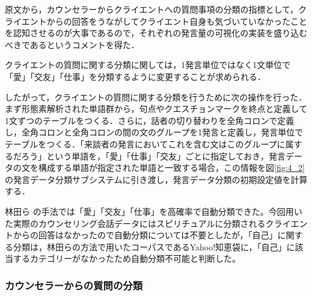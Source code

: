 \documentclass[shuuron]{kuee}
\begin{document}
原文から，カウンセラーからクライエントへの質問事項の分類の指標として，クライエントからの回答をうながしてクライエント自身も気づいていなかったことを認知させるのが大事であるので，それぞれの発言量の可視化の実装を盛り込むべきであるというコメントを得た．

クライエントの質問に関する分類に関しては，1発言単位ではなく1文単位で「愛」「交友」「仕事」を分類するように変更することが求められる．


したがって，クライエントの質問に関する分類を行うために次の操作を行った．まず形態素解析された単語群から，句点やクエスチョンマークを終点と定義して1文ずつのテーブルをつくる．さらに，話者の切り替わりを全角コロンで定義し，全角コロンと全角コロンの間の文のグループを1発言と定義し，発言単位でテーブルをつくる．「来談者の発言においてこれを含む文はこのグループに属するだろう」という単語を，「愛」「仕事」「交友」ごとに指定しておき，発言データの文を構成する単語が指定された単語と一致する場合，この情報を図\ref{fig:4_2}の発言データ分類サブシステムに引き渡し，発言データ分類の初期設定値を計算する．

林田ら\cite{hayashidaJp} \cite{hayashidaEn}の手法では「愛」「交友」「仕事」を高確率で自動分類できた。今回用いた実際のカウンセリング会話データにはスピリチュアルに分類されるクライエントからの回答はなかったので自動分類については不要としたが，「自己」に関する分類は，林田らの方法で用いたコーパスであるYahoo!知恵袋に，「自己」に該当するカテゴリーがなかったため自動分類不可能と判断した。%

\subsubsection{カウンセラーからの質問の分類}
\end{document}
